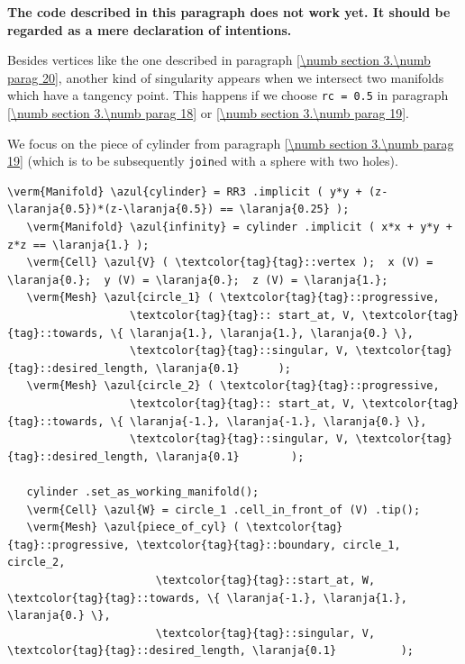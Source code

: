 {\normalfont\bfseries The code described in this paragraph does not work yet.
It should be regarded as a mere declaration of intentions.}
\medskip

Besides vertices like the one described in paragraph \ref{\numb section 3.\numb parag 20},
another kind of singularity appears when we intersect two manifolds which have a tangency point.
This happens if we choose {\small\tt rc = 0.5} in paragraph \ref{\numb section 3.\numb parag 18}
or \ref{\numb section 3.\numb parag 19}.

We focus on the piece of cylinder from paragraph \ref{\numb section 3.\numb parag 19}
(which is to be subsequently {\small\tt join}ed with a sphere with two holes).

\begin{Verbatim}[commandchars=\\\{\},formatcom=\small\tt,frame=single,
   label=code not working,rulecolor=\color{coment},
   baselinestretch=0.94,framesep=2mm                                  ]
   \verm{Manifold} \azul{cylinder} = RR3 .implicit ( y*y + (z-\laranja{0.5})*(z-\laranja{0.5}) == \laranja{0.25} );
   \verm{Manifold} \azul{infinity} = cylinder .implicit ( x*x + y*y + z*z == \laranja{1.} );
   \verm{Cell} \azul{V} ( \textcolor{tag}{tag}::vertex );  x (V) = \laranja{0.};  y (V) = \laranja{0.};  z (V) = \laranja{1.};
   \verm{Mesh} \azul{circle_1} ( \textcolor{tag}{tag}::progressive,
                   \textcolor{tag}{tag}:: start_at, V, \textcolor{tag}{tag}::towards, \{ \laranja{1.}, \laranja{1.}, \laranja{0.} \},
                   \textcolor{tag}{tag}::singular, V, \textcolor{tag}{tag}::desired_length, \laranja{0.1}      );
   \verm{Mesh} \azul{circle_2} ( \textcolor{tag}{tag}::progressive,
                   \textcolor{tag}{tag}:: start_at, V, \textcolor{tag}{tag}::towards, \{ \laranja{-1.}, \laranja{-1.}, \laranja{0.} \},
                   \textcolor{tag}{tag}::singular, V, \textcolor{tag}{tag}::desired_length, \laranja{0.1}        );

   cylinder .set_as_working_manifold();
   \verm{Cell} \azul{W} = circle_1 .cell_in_front_of (V) .tip();
   \verm{Mesh} \azul{piece_of_cyl} ( \textcolor{tag}{tag}::progressive, \textcolor{tag}{tag}::boundary, circle_1, circle_2,
                       \textcolor{tag}{tag}::start_at, W, \textcolor{tag}{tag}::towards, \{ \laranja{-1.}, \laranja{1.}, \laranja{0.} \},
                       \textcolor{tag}{tag}::singular, V, \textcolor{tag}{tag}::desired_length, \laranja{0.1}          );
\end{Verbatim}

